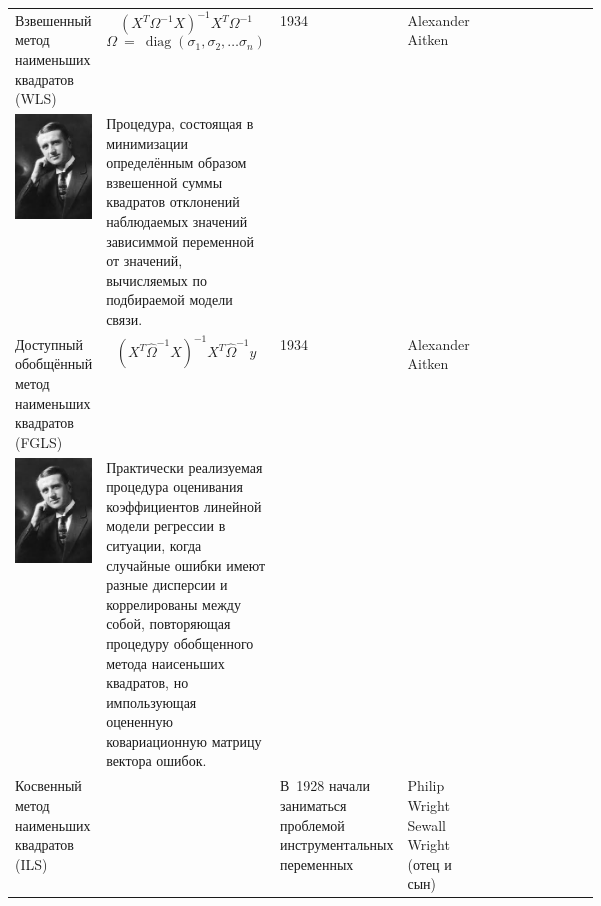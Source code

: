 \documentclass[10pt,a4paper]{article}
\DeclareMathOperator{\diag}{diag}  %
\begin{document}
\begin{table}
\begin{tabular}{|m{0.066\linewidth}|m{.11\linewidth}|m{.065\linewidth}|m{.05\linewidth}|m{0.205\linewidth}|m{0.412\linewidth}|}
\hline
Взвешенный метод наименьших квадратов (WLS) &  $$(X^T \Omega^{-1} X)^{-1}  X^T \Omega^{-1}$$
\- $$\Omega~=~\diag(\sigma_1,\sigma_2, \ldots \sigma_n)$$ & 1934 & Alexander Aitken & \begin{minipage}[t]{\linewidth} \centering \ \\\includegraphics[width=0.25\linewidth]{alexander_craig_aitken_1_large.jpg}
\end{minipage} & Процедура, состоящая в минимизации определённым образом взвешенной суммы квадратов отклонений наблюдаемых значений зависиммой переменной от значений, вычисляемых по подбираемой модели связи. \\
\hline
Доступный обобщённый метод наименьших квадратов (FGLS) &  $$(X^T \hat{\Omega}^{-1} X)^{-1}X^T \hat{\Omega}^{-1} y$$ & 1934 & Alexander Aitken & \begin{minipage}[t]{\linewidth} \centering \ \\ 
\includegraphics[width=0.25\linewidth]{alexander_craig_aitken_1_large.jpg} \hfill
\end{minipage} & Практически реализуемая процедура оценивания коэффициентов линейной модели регрессии в ситуации, когда случайные ошибки имеют разные дисперсии и коррелированы между собой, повторяющая процедуру обобщенного метода наисеньших квадратов, но импользующая оцененную ковариационную матрицу вектора ошибок. \\
\hline
Косвенный метод наименьших квадратов (ILS) & & \footnotesize{В}~1928 \footnotesize{начали заниматься проблемой инструментальных переменных}  & Philip Wright \newline Sewall Wright \newline \footnotesize{(отец и сын)}& 

\end{tabular}
\end{table}
\end{document}
